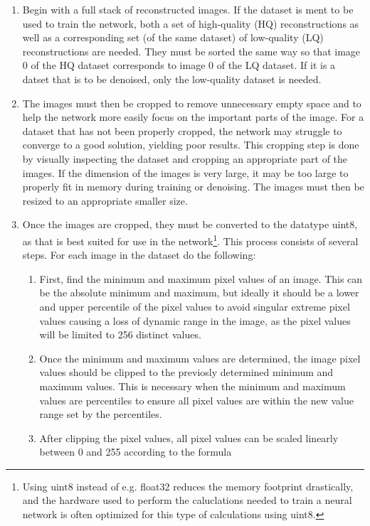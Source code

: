 \begin{enumerate}
    \item Begin with a full stack of reconstructed images. If the dataset is ment to be used to train the network, both a set of high-quality (HQ) reconstructions as well as a corresponding set (of the same dataset) of low-quality (LQ) reconstructions are needed. They must be sorted the same way so that image 0 of the HQ dataset corresponds to image 0 of  the LQ dataset. If it is a datset that is to be denoised, only the low-quality dataset is needed. 
    \item The images must then be cropped to remove unnecessary empty space and to help the network more easily focus on the important parts of the image. For a dataset that has not been properly cropped, the network may struggle to converge to a good solution, yielding poor results. This cropping step is done by visually inspecting the dataset and cropping an appropriate part of the images. If the dimension of the images is very large, it may be too large to properly fit in memory during training or denoising. The images must then be resized to an appropriate smaller size. 
    \item Once the images are cropped, they must be converted to the datatype uint8, as that is best suited for use in the network\footnote{Using uint8 instead of e.g. float32 reduces the memory footprint drastically, and the hardware used to perform the caluclations needed to train a neural network is often optimized for this type of calculations using uint8. }. This process consists of several steps. For each image in the dataset do the following:
    \begin{enumerate}
        \item First, find the minimum and maximum pixel values of an image. This can be the absolute minimum and maximum, but ideally it should be a lower and upper percentile of the pixel values to avoid singular extreme pixel values causing a loss of dynamic range in the image, as the pixel values will be limited to 256 distinct values. 
        \item Once the minimum and maximum values are determined, the image pixel values should be clipped to the previosly determined minimum and maximum values. This is necessary when the minimum and maximum values are percentiles to ensure all pixel values are within the new value range set by the percentiles.
        \item After clipping the pixel values, all pixel values can be scaled linearly between 0 and 255 according to the formula 

\end{enumerate}
\end{enumerate}
